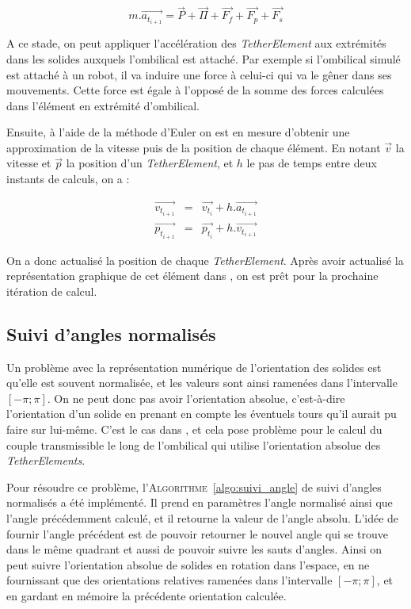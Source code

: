 				\begin{equation}
					m.\overrightarrow{a_{t_{i+1}}} = \overrightarrow{P} + \overrightarrow{\Pi} + \overrightarrow{F_f} + \overrightarrow{F_p} + \overrightarrow{F_s}
					\label{eq:newton}
				\end{equation}

				A ce stade, on peut appliquer l'accélération des \textit{TetherElement} aux extrémités dans les solides auxquels l'ombilical est attaché. Par exemple si l'ombilical simulé est attaché à un robot, il va induire une force à celui-ci qui va le gêner dans ses mouvements. Cette force est égale à l'opposé de la somme des forces calculées dans l'élément en extrémité d'ombilical.
				
				Ensuite, à l'aide de la méthode d'Euler on est en mesure d'obtenir une approximation de la vitesse puis de la position de chaque élément. En notant $\overrightarrow{v}$ la vitesse et $\overrightarrow{p}$ la position d'un \textit{TetherElement}, et $h$ le pas de temps entre deux instants de calculs, on a :

				\begin{eqnarray}
					\overrightarrow{v_{t_{i+1}}} & = & \overrightarrow{v_{t_i}} + h.\overrightarrow{a_{t_{i+1}}} \\
					\overrightarrow{p_{t_{i+1}}} & = & \overrightarrow{p_{t_i}} + h.\overrightarrow{v_{t_{i+1}}}
					\label{eq:euler}
				\end{eqnarray}

				On a donc actualisé la position de chaque \textit{TetherElement}. Après avoir actualisé la représentation graphique de cet élément dans \gazebo{}, on est prêt pour la prochaine itération de calcul.
			
			\subsection{Suivi d'angles normalisés}
				Un problème avec la représentation numérique de l'orientation des solides est qu'elle est souvent normalisée, et les valeurs sont ainsi ramenées dans l'intervalle $[-\pi; \pi]$. On ne peut donc pas avoir l'orientation absolue, c’est-à-dire l'orientation d'un solide en prenant en compte les éventuels tours qu'il aurait pu faire sur lui-même. C'est le cas dans \gazebo{}, et cela pose problème pour le calcul du couple transmissible le long de l'ombilical qui utilise l'orientation absolue des \textit{TetherElements}.
			
				Pour résoudre ce problème, l'\textsc{Algorithme}~\ref{algo:suivi_angle} de suivi d'angles normalisés a été implémenté. Il prend en paramètres l'angle normalisé ainsi que l'angle précédemment calculé, et il retourne la valeur de l'angle absolu. L'idée de fournir l'angle précédent est de pouvoir retourner le nouvel angle qui se trouve dans le même quadrant et aussi de pouvoir suivre les sauts d'angles. Ainsi on peut suivre l'orientation absolue de solides en rotation dans l'espace, en ne fournissant que des orientations relatives ramenées dans l'intervalle $[-\pi; \pi]$, et en gardant en mémoire la précédente orientation calculée.
				
